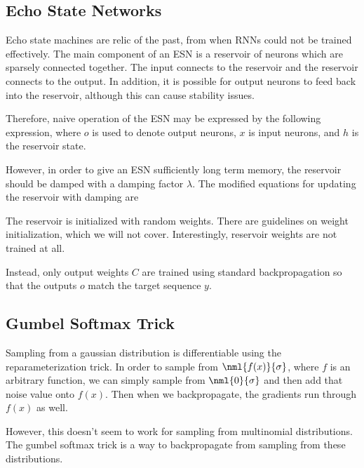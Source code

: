 \documentclass[12pt]{article}
\begin{document}
\subsection{Echo State Networks}

Echo state machines are relic of the past, from when RNNs could not be trained effectively. The main component of an ESN is a reservoir of neurons which are sparsely connected together. The input connects to the reservoir and the reservoir connects to the output. In addition, it is possible for output neurons to feed back into the reservoir, although this can cause stability issues.

Therefore, naive operation of the ESN may be expressed by the following expression, where $o$ is used to denote output neurons, $x$ is input neurons, and $h$ is the reservoir state.


However, in order to give an ESN sufficiently long term memory, the reservoir should be damped with a damping factor $\lambda$. The modified equations for updating the reservoir with damping are


The reservoir is initialized with random weights. There are guidelines on weight initialization, which we will not cover. Interestingly, reservoir weights are not trained at all.

Instead, only output weights $C$ are trained using standard backpropagation so that the outputs $o$ match the target sequence $y$. 

\subsection{Gumbel Softmax Trick}

Sampling from a gaussian distribution is differentiable using the reparameterization trick. In order to sample from $\nml{f(x)}{\sigma}$, where $f$ is an arbitrary function, we can simply sample from $\nml{0}{\sigma}$ and then add that noise value onto $f(x)$. Then when we backpropagate, the gradients run through $f(x)$ as well.

However, this doesn't seem to work for sampling from multinomial distributions. The gumbel softmax trick is a way to backpropagate from sampling from these distributions. 
\end{document}

